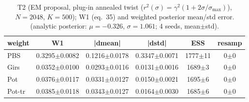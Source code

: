 \begin{table}[ht]
\centering
\caption{T2 (EM proposal, plug-in annealed twist ($r^2(\sigma)=\gamma^2(1+2\sigma/\sigma_{\max})$), $N=2048$, $K=500$); W1 (eq.~35) and weighted posterior mean/std error. (analytic posterior: $\mu=-0.326$, $\sigma=1.061$; 4 seeds, mean$\pm$std).}
\label{tab:toy_t2_em}
\begin{tabular}{lccccc}
\toprule
weight & W1 & |dmean| & |dstd| & ESS & resamp \\
\midrule
PBS & 0.3295$\pm$0.0082 & 0.1216$\pm$0.0178 & 0.3347$\pm$0.0071 & 1777$\pm$11 & 0$\pm$0 \\
Girs & 0.0352$\pm$0.0100 & 0.0293$\pm$0.0116 & 0.0131$\pm$0.0016 & 1689$\pm$3 & 0$\pm$0 \\
Pot & 0.0376$\pm$0.0117 & 0.0331$\pm$0.0127 & 0.0150$\pm$0.0021 & 1695$\pm$6 & 0$\pm$0 \\
Pot-tr & 0.0385$\pm$0.0118 & 0.0343$\pm$0.0127 & 0.0164$\pm$0.0030 & 1685$\pm$6 & 0$\pm$0 \\
\bottomrule
\end{tabular}
\end{table}

